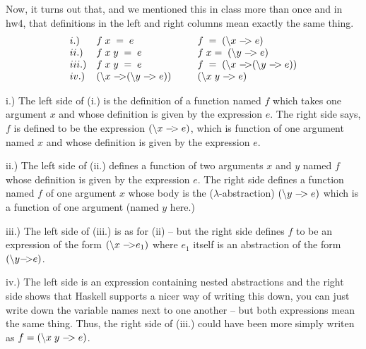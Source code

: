 \documentclass[11pt]{article}
\begin{document}
Now, it turns out that, and we mentioned this in class more than once and in hw4,
that  definitions in the left and right columns mean exactly the same thing.
\[ \begin{array}{llcl}
i.) & f\; x\;  =\; e\; \;  &\ \ &  f\; =\; (\backslash{}x\; \harrow \; e)                    \\
ii.) & f\; x\; y\; =\; e\; \;  &\ \ &  f\; x =\; (\backslash{}y\; \harrow \; e)              \\
iii.) & f\; x\; y\; =\; e\; \;  &\ \ &  f\; =\; (\backslash{}x\; \harrow (\backslash{}y\; \harrow \; e))             \\
iv.) & (\backslash{}x\; \harrow (\backslash{}y\; \harrow \; e))  &\ \ &  (\backslash{}x\; y \; \harrow \; e)             \\
\end{array}\]
\begin{description}
\item{i.)}
The left side of (i.) is the definition of a function named $f$ which
takes one argument $x$ and whose definition is given by the expression $e$.
The right side says, $f$ is defined to be the expression $(\backslash{}x\;
{\tt{-\!\!\!>}} \; e)$, which is function of one argument named $x$ and whose
definition is given by the expression $e$.  

\item{ii.)}  The left side of (ii.)  defines a function of two arguments $x$
and $y$ named $f$ whose definition is given by the expression $e$. The right
side defines a function named $f$ of one argument $x$ whose body is the
($\lambda$-abstraction) $(\backslash{}y\; {\tt{-\!\!\!>}} \; e)$ which is a function of
one argument (named $y$ here.)

\item{iii.)}  The left side of (iii.) is as for (ii) -- but the right side
defines $f$ to be an expression of the form $(\backslash{}x\; {\tt{-\!\!\!>}} e_1)$ where
$e_1$ itself is an abstraction of the form $(\backslash{}y {\tt{-\!\!\!>}} e)$.  

\item{iv.)} The left side is an expression containing nested abstractions and
the right side shows that Haskell supports a nicer way of writing this down,
you can just write down the variable names next to one another -- but both
expressions mean the same thing.  Thus, the right side of (iii.) could have
been more simply writen as $f = (\backslash{}x\; y \; {\tt{-\!\!\!>}} \; e)$.
\end{description}
\end{document}
